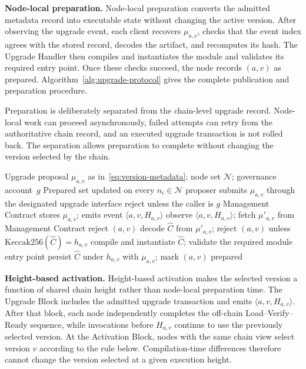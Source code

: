 \documentclass[runningheads]{llncs}
\begin{document}
\noindent\textbf{Node-local preparation.} Node-local preparation converts the admitted metadata record into executable state without changing the active version. After observing the upgrade event, each client recovers $\mu_{a,v}$, checks that the event index agrees with the stored record, decodes the artifact, and recomputes its hash. The Upgrade Handler then compiles and instantiates the module and validates its required entry point. Once these checks succeed, the node records $(a,v)$ as prepared. Algorithm~\ref{alg:upgrade-protocol} gives the complete publication and preparation procedure.

Preparation is deliberately separated from the chain-level upgrade record. Node-local work can proceed asynchronously, failed attempts can retry from the authoritative chain record, and an executed upgrade transaction is not rolled back. The separation allows preparation to complete without changing the version selected by the chain.

\begin{algorithm}[!htb]
\caption{\textbf{Activation-Block-based WASM upgrade protocol.}}
\label{alg:upgrade-protocol}
\begin{algorithmic}[1]
\Require Upgrade proposal $\mu_{a,v}$ as in~\eqref{eq:version-metadata}; node set $\mathcal{N}$; governance account~$g$
\Ensure Prepared set updated on every $n_i\in\mathcal{N}$
\State proposer submits $\mu_{a,v}$ through the designated upgrade interface
\State reject unless the caller is $g$
\State Management Contract stores $\mu_{a,v}$; emits event $\langle a,v,H_{a,v}\rangle$
    \State observe $\langle a,v,H_{a,v}\rangle$; fetch $\mu'_{a,v}$ from Management Contract
        \State reject $(a,v)$
    \Else
        \State decode $\widehat{C}$ from $\mu'_{a,v}$; reject $(a,v)$ unless $\mathrm{Keccak256}(\widehat{C})=h_{a,v}$\label{line:hash-check}
        \Repeat
        \State compile and instantiate $\widehat{C}$; validate the required module entry point
        \State persist $\widehat{C}$ under $h_{a,v}$ with $\mu_{a,v}$; mark $(a,v)$ prepared\label{line:mark-prepared}
    \EndIf
\EndFor
\end{algorithmic}
\end{algorithm}

\noindent\textbf{Height-based activation.} Height-based activation makes the selected version a function of shared chain height rather than node-local preparation time. The Upgrade Block includes the admitted upgrade transaction and emits $\langle a,v,H_{a,v}\rangle$. After that block, each node independently completes the off-chain Load--Verify--Ready sequence, while invocations before $H_{a,v}$ continue to use the previously selected version. At the Activation Block, nodes with the same chain view select version $v$ according to the rule below. Compilation-time differences therefore cannot change the version selected at a given execution height.
\end{document}
